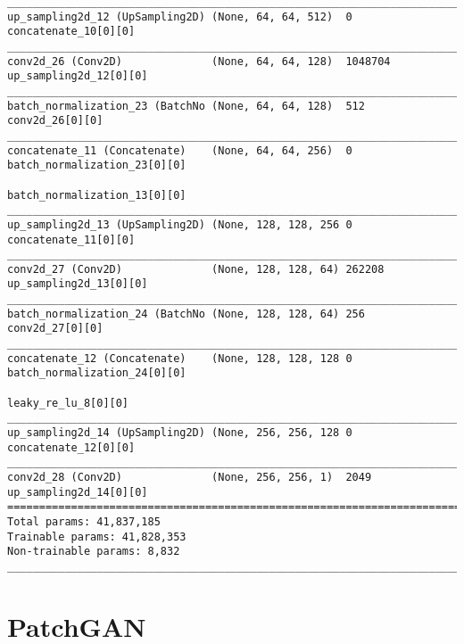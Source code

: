 \begin{verbatim}
__________________________________________________________________________________________________
up_sampling2d_12 (UpSampling2D) (None, 64, 64, 512)  0           concatenate_10[0][0]             
__________________________________________________________________________________________________
conv2d_26 (Conv2D)              (None, 64, 64, 128)  1048704     up_sampling2d_12[0][0]           
__________________________________________________________________________________________________
batch_normalization_23 (BatchNo (None, 64, 64, 128)  512         conv2d_26[0][0]                  
__________________________________________________________________________________________________
concatenate_11 (Concatenate)    (None, 64, 64, 256)  0           batch_normalization_23[0][0]     
                                                                 batch_normalization_13[0][0]     
__________________________________________________________________________________________________
up_sampling2d_13 (UpSampling2D) (None, 128, 128, 256 0           concatenate_11[0][0]             
__________________________________________________________________________________________________
conv2d_27 (Conv2D)              (None, 128, 128, 64) 262208      up_sampling2d_13[0][0]           
__________________________________________________________________________________________________
batch_normalization_24 (BatchNo (None, 128, 128, 64) 256         conv2d_27[0][0]                  
__________________________________________________________________________________________________
concatenate_12 (Concatenate)    (None, 128, 128, 128 0           batch_normalization_24[0][0]     
                                                                 leaky_re_lu_8[0][0]              
__________________________________________________________________________________________________
up_sampling2d_14 (UpSampling2D) (None, 256, 256, 128 0           concatenate_12[0][0]             
__________________________________________________________________________________________________
conv2d_28 (Conv2D)              (None, 256, 256, 1)  2049        up_sampling2d_14[0][0]           
==================================================================================================
Total params: 41,837,185
Trainable params: 41,828,353
Non-trainable params: 8,832
__________________________________________________________________________________________________
\end{verbatim}

\section{PatchGAN}
\label{appendix:patch_gan}

